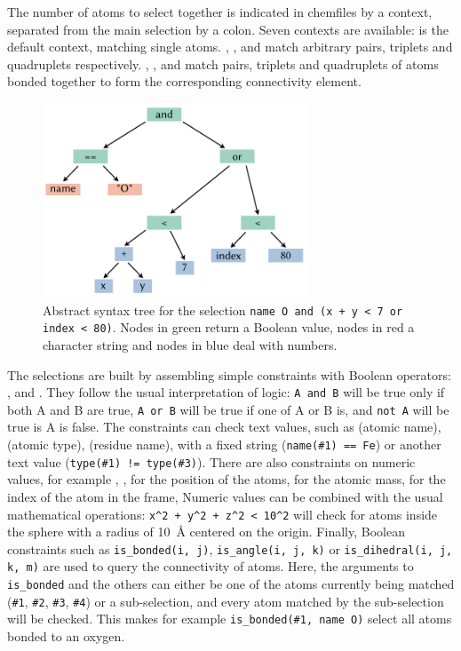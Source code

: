 \documentclass[thesis]{subfiles}
\begin{document}
The number of atoms to select together is indicated in chemfiles by a context,
separated from the main selection by a colon. Seven contexts are available:
 is the default context, matching single atoms. ,
, and  match arbitrary pairs, triplets and quadruplets
respectively. , , and  match pairs,
triplets and quadruplets of atoms bonded together to form the corresponding
connectivity element.

\begin{figure}[ht]
    \centering
    \includegraphics[width=0.7\textwidth]{figures/images/chemfiles-selection-ast}
    \caption{Abstract syntax tree for the selection \texttt{name O and (x + y <
    7 or index < 80)}. Nodes in green return a Boolean value, nodes in red a
    character string and nodes in blue deal with numbers.}
    \label{fig:chemfiles:selection-ast}
\end{figure}

The selections are built by assembling simple constraints with Boolean operators:
,  and . They follow the usual interpretation of
logic: \texttt{A and B} will be true only if both A and B are true, \texttt{A or
B} will be true if one of A or B is, and \texttt{not A} will be true is A is
false. The constraints can check text values, such as  (atomic name),
 (atomic type),  (residue name), with a fixed string
(\texttt{name(\#1) == Fe}) or another text value (\texttt{type(\#1) !=
type(\#3)}). There are also constraints on numeric values, for example ,
,  for the position of the atoms,  for the atomic
mass,  for the index of the atom in the frame, \etc Numeric values
can be combined with the usual mathematical operations: \texttt{x\^{}2 + y\^{}2
+ z\^{}2 < 10\^{}2} will check for atoms inside the sphere with a radius of
\SI{10}{\AA} centered on the origin. Finally, Boolean constraints such as
\texttt{is\_bonded(i, j)}, \texttt{is\_angle(i, j, k)} or
\texttt{is\_dihedral(i, j, k, m)} are used to query the connectivity of atoms.
Here, the arguments to \texttt{is\_bonded} and the others can either be one of
the atoms currently being matched (\texttt{\#1}, \texttt{\#2}, \texttt{\#3},
\texttt{\#4}) or a sub-selection, and every atom matched by the sub-selection
will be checked. This makes for example \texttt{is\_bonded(\#1, name O)} select
all atoms bonded to an oxygen.
\end{document}
